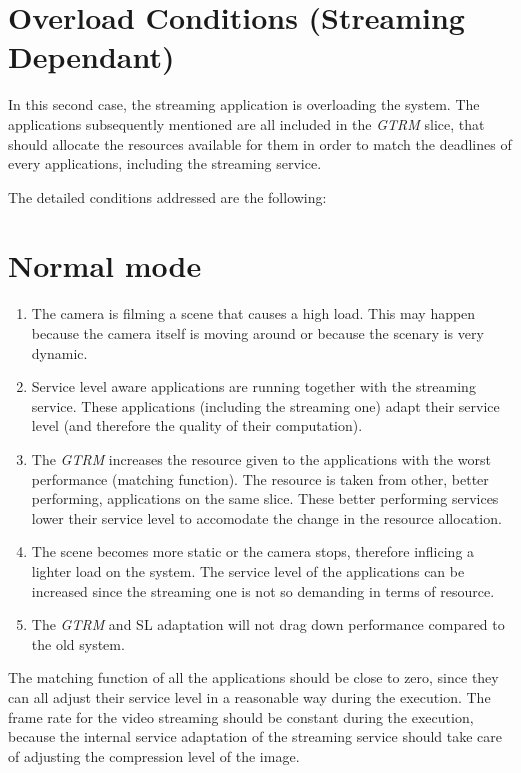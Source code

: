 \documentclass[nobiblatex]{LTHthesis}
\begin{document}
\section{Overload Conditions (Streaming Dependant)}

In this second case, the streaming application is overloading the system.
The applications subsequently mentioned are all included in the \emph{GTRM} slice,
that should allocate the resources available for them in order to match
the deadlines of every applications, including the streaming service.

The detailed conditions addressed are the following:
\section{Normal mode}
\begin{enumerate}
\item The camera is filming a scene that causes a high load. This may happen
  because the camera itself is moving around or because the scenary is
  very dynamic.
\item Service level aware applications are running together with the
  streaming service. These applications (including the streaming one) adapt
  their service level (and therefore the quality of their computation).
\item The \emph{GTRM} increases the resource given to the applications with the
  worst performance (matching function). The resource is taken from other,
  better performing, applications on the same slice. These better performing
  services lower their service level to accomodate the change in the resource
  allocation.
\item The scene becomes more static or the camera stops, therefore inflicing
  a lighter load on the system. The service level of the applications can be
  increased since the streaming one is not so demanding in terms of resource.
\item The \emph{GTRM} and SL adaptation will not drag down performance compared to the old system.
\end{enumerate}

The matching function of all the applications should be close to zero, since
they can all adjust their service level in a reasonable way during the
execution. The frame rate for the video streaming should be constant during
the execution, because the internal service adaptation of the streaming
service should take care of adjusting the compression level of the image.
\end{document}
